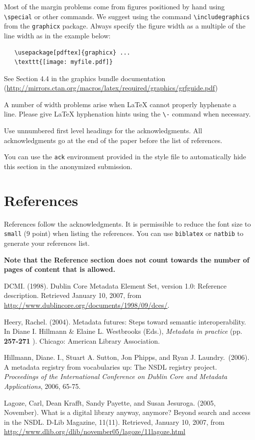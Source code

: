 \documentclass[11pt,a4paper]{article}
\begin{document}
Most of the margin problems come from figures positioned by hand using
\verb+\special+ or other commands. We suggest using the command
\verb+\includegraphics+ from the \verb+graphicx+ package. Always specify the
figure width as a multiple of the line width as in the example below:
\begin{verbatim}
   \usepackage[pdftex]{graphicx} ...
   \texttt{[image: myfile.pdf]}
\end{verbatim}
See Section 4.4 in the graphics bundle documentation
(\url{http://mirrors.ctan.org/macros/latex/required/graphics/grfguide.pdf})

A number of width problems arise when \LaTeX{} cannot properly hyphenate a
line. Please give LaTeX hyphenation hints using the \verb+\-+ command when
necessary.


\begin{ack}
Use unnumbered first level headings for the acknowledgments. All acknowledgments
go at the end of the paper before the list of references.

You can use the \texttt{ack} environment provided in the style file to automatically hide this section in the anonymized submission.
\end{ack}

\section*{References}

References follow the acknowledgments. It is permissible to reduce the font size to \verb+small+ (9 point) when listing the references. You can use \verb+biblatex+ or  \verb+natbib+ to generate your references list.

{\bf Note that the Reference section does not count towards the number of pages of content that is allowed.}
\medskip

\small


\hangindent=0.7cm DCMI. (1998).  Dublin Core Metadata Element Set, version 1.0: Reference description.  Retrieved January 10, 2007, from \url{http://www.dublincore.org/documents/1998/09/dces/}.

\hangindent=0.7cm Heery, Rachel.  (2004). Metadata futures: Steps toward semantic interoperability. In Diane I. Hillmann \& Elaine L. Westbrooks (Eds.), {\it Metadata in practice}  (pp. {\bf 257-271
}).  Chicago: American Library Association.

\hangindent=0.7cm Hillmann, Diane. I., Stuart A. Sutton, Jon Phipps, and Ryan J. Laundry.\ (2006). A metadata registry from vocabularies up: The NSDL registry project.  {\it Proceedings of the International Conference on Dublin Core and Metadata Applications}, 2006, 65-75.

\hangindent=0.7cm Lagoze, Carl, Dean Krafft, Sandy Payette, and Susan Jesuroga. (2005, November). What is a digital library anyway, anymore? Beyond search and access in the NSDL.  D-Lib Magazine, 11(11).  Retrieved, January 10, 2007, from \url{http://www.dlib.org/dlib/november05/lagoze/11lagoze.html}
\end{document}
